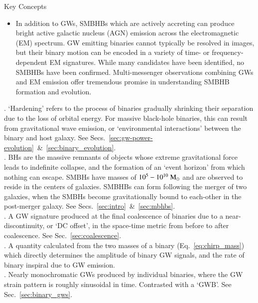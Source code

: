 \documentclass[onecolumn,authoryear]{els-mrw}
\begin{document}
\begin{BoxTypeA}{Key Concepts}
\begin{itemize}
    \item In addition to GWs, SMBHBs which are actively accreting can produce bright active galactic nucleus (AGN) emission across the electromagnetic (EM) spectrum.  GW emitting binaries cannot typically be resolved in images, but their binary motion can be encoded in a variety of time- or frequency- dependent EM signatures.  While many candidates have been identified, no SMBHBs have been confirmed.  Multi-messenger observations combining GWs and EM emission offer tremendous promise in understanding SMBHB formation and evolution.
\end{itemize}
\end{BoxTypeA}


\begin{glossary}[Glossary]
    .  `Hardening' refers to the process of binaries gradually shrinking their separation due to the loss of orbital energy.  For massive black-hole binaries, this can result from gravitational wave emission, or `environmental interactions' between the binary and host galaxy. See Secs.~\ref{sec:gw-power-evolution}~\&~\ref{sec:binary_evolution}. \\
    .  BHs are the massive remnants of objects whose extreme gravitational force leads to indefinite collapse, and the formation of an `event horizon' from which nothing can escape.  SMBHs have masses of $10^5 - 10^{10}~\textrm{M}_{\odot}$ and are observed to reside in the centers of galaxies.  SMBHBs can form following the merger of two galaxies, when the SMBHs become gravitationally bound to each-other in the post-merger galaxy.  See Secs.~\ref{sec:intro}~\&~\ref{sec:mbhbs}. \\
    . A GW signature produced at the final coalescence of binaries due to a near-discontinuity, or `DC offset', in the space-time metric from before to after coalescence. See Sec.~\ref{sec:coalescence}. \\
    .  A quantity calculated from the two masses of a binary (Eq.~\ref{eq:chirp_mass}) which directly determines the amplitude of binary GW signals, and the rate of binary inspiral due to GW emission. \\
    .  Nearly monochromatic GWs produced by individual binaries, where the GW strain pattern is roughly sinusoidal in time.  Contrasted with a `GWB'.  See Sec.~\ref{sec:binary_gws}. \\

\end{glossary}
\end{document}
